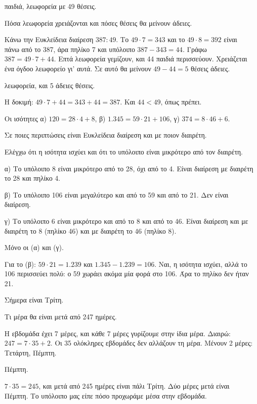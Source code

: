 
 παιδιά, λεωφορεία με 49 θέσεις.\par
\tithelo Πόσα λεωφορεία χρειάζονται και πόσες θέσεις θα μείνουν άδειες.\par
\possindeo Κάνω την Ευκλείδεια διαίρεση $387:49$. Το $49\cdot 7=343$ και το $49\cdot 8=392$ είναι πάνω από το 387, άρα πηλίκο 7 και υπόλοιπο $387-343=44$. Γράφω $387=49\cdot 7+44$. Επτά λεωφορεία γεμίζουν, και 44 παιδιά περισσεύουν. Χρειάζεται ένα όγδοο λεωφορείο γι' αυτά. Σε αυτό θα μείνουν $49-44=5$ θέσεις άδειες.\par
{} λεωφορεία, και 5 άδειες θέσεις.\par
\elegxos Η δοκιμή: $49\cdot 7+44=343+44=387$. Και $44<49$, όπως πρέπει.

\tixero Οι ισότητες α) $120=28\cdot 4+8$, β) $1.345=59\cdot 21+106$, γ) $374=8\cdot 46+6$.\par
\tithelo Σε ποιες περιπτώσεις είναι Ευκλείδεια διαίρεση και με ποιον διαιρέτη.\par
\possindeo Ελέγχω ότι η ισότητα ισχύει και ότι το υπόλοιπο είναι μικρότερο από τον διαιρέτη.\par
α) Το υπόλοιπο 8 είναι μικρότερο από το 28, όχι από το 4. Είναι διαίρεση με διαιρέτη το 28 και πηλίκο 4.\par
β) Το υπόλοιπο 106 είναι μεγαλύτερο και από το 59 και από το 21. Δεν είναι διαίρεση.\par
γ) Το υπόλοιπο 6 είναι μικρότερο και από το 8 και από το 46. Είναι διαίρεση και με διαιρέτη το 8 (πηλίκο 46) και με διαιρέτη το 46 (πηλίκο 8).\par
\apantisi Μόνο οι (α) και (γ).\par
\elegxos Για το (β): $59\cdot 21=1.239$ και $1.345-1.239=106$. Ναι, η ισότητα ισχύει, αλλά το 106 περισσεύει πολύ: ο 59 χωράει ακόμα μία φορά στο 106. Άρα το πηλίκο δεν ήταν 21.

\tixero Σήμερα είναι Τρίτη.\par
\tithelo Τι μέρα θα είναι μετά από 247 ημέρες.\par
\possindeo Η εβδομάδα έχει 7 μέρες, και κάθε 7 μέρες γυρίζουμε στην ίδια μέρα. Διαιρώ: $247=7\cdot 35+2$. Οι 35 ολόκληρες εβδομάδες δεν αλλάζουν τη μέρα. Μένουν 2 μέρες: Τετάρτη, Πέμπτη.\par
\apantisi Πέμπτη.\par
\elegxos $7\cdot 35=245$, και μετά από 245 ημέρες είναι πάλι Τρίτη. Δύο μέρες μετά είναι Πέμπτη. Το υπόλοιπο μας είπε πόσο προχωράμε μέσα στην εβδομάδα.

